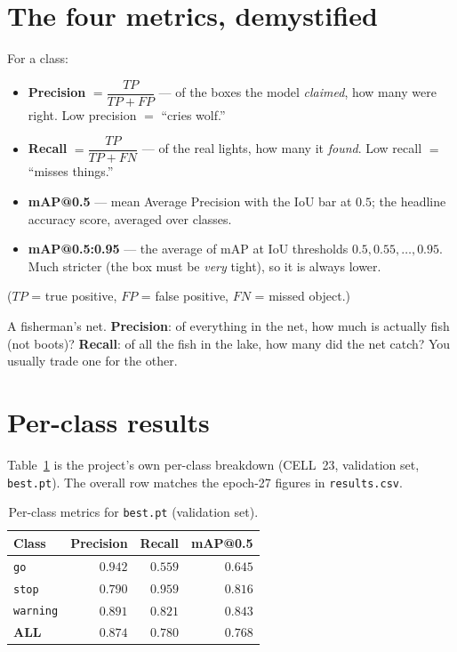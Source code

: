 \section{The four metrics, demystified}
\begin{keyconcept}
For a class:
\begin{itemize}
  \item \textbf{Precision} $=\dfrac{TP}{TP+FP}$ --- of the boxes the model
        \emph{claimed}, how many were right. Low precision $=$ ``cries
        wolf.''
  \item \textbf{Recall} $=\dfrac{TP}{TP+FN}$ --- of the real lights, how
        many it \emph{found}. Low recall $=$ ``misses things.''
  \item \textbf{mAP@0.5} --- mean Average Precision with the IoU bar at
        $0.5$; the headline accuracy score, averaged over classes.
  \item \textbf{mAP@0.5:0.95} --- the average of mAP at IoU thresholds
        $0.5,0.55,\dots,0.95$. Much stricter (the box must be
        \emph{very} tight), so it is always lower.
\end{itemize}
($TP$ = true positive, $FP$ = false positive, $FN$ = missed object.)
\end{keyconcept}

\begin{analogy}
A fisherman's net. \textbf{Precision}: of everything in the net, how much
is actually fish (not boots)? \textbf{Recall}: of all the fish in the
lake, how many did the net catch? You usually trade one for the other.
\end{analogy}

\section{Per-class results}
Table~\ref{tab:results} is the project's own per-class breakdown
(CELL~23, validation set, \texttt{best.pt}). The overall row matches the
epoch-27 figures in \texttt{results.csv}.

\begin{table}[H]\centering
\caption{Per-class metrics for \texttt{best.pt} (validation set).}
\label{tab:results}
\begin{tabular}{lrrr}
\toprule
Class & Precision & Recall & mAP@0.5 \\
\midrule
\texttt{go}      & $0.942$ & $0.559$ & $0.645$ \\
\texttt{stop}    & $0.790$ & $0.959$ & $0.816$ \\
\texttt{warning} & $0.891$ & $0.821$ & $0.843$ \\
\midrule
\textbf{ALL}     & $0.874$ & $0.780$ & $0.768$ \\
\bottomrule
\end{tabular}
\end{table}

